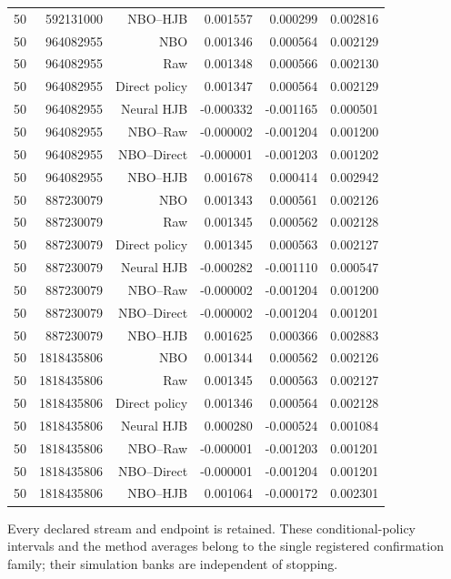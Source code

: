 \begin{longtable}{lrrrrr}
50 & 592131000 & NBO--HJB & 0.001557 & 0.000299 & 0.002816 \\
50 & 964082955 & NBO & 0.001346 & 0.000564 & 0.002129 \\
50 & 964082955 & Raw & 0.001348 & 0.000566 & 0.002130 \\
50 & 964082955 & Direct policy & 0.001347 & 0.000564 & 0.002129 \\
50 & 964082955 & Neural HJB & -0.000332 & -0.001165 & 0.000501 \\
50 & 964082955 & NBO--Raw & -0.000002 & -0.001204 & 0.001200 \\
50 & 964082955 & NBO--Direct & -0.000001 & -0.001203 & 0.001202 \\
50 & 964082955 & NBO--HJB & 0.001678 & 0.000414 & 0.002942 \\
50 & 887230079 & NBO & 0.001343 & 0.000561 & 0.002126 \\
50 & 887230079 & Raw & 0.001345 & 0.000562 & 0.002128 \\
50 & 887230079 & Direct policy & 0.001345 & 0.000563 & 0.002127 \\
50 & 887230079 & Neural HJB & -0.000282 & -0.001110 & 0.000547 \\
50 & 887230079 & NBO--Raw & -0.000002 & -0.001204 & 0.001200 \\
50 & 887230079 & NBO--Direct & -0.000002 & -0.001204 & 0.001201 \\
50 & 887230079 & NBO--HJB & 0.001625 & 0.000366 & 0.002883 \\
50 & 1818435806 & NBO & 0.001344 & 0.000562 & 0.002126 \\
50 & 1818435806 & Raw & 0.001345 & 0.000563 & 0.002127 \\
50 & 1818435806 & Direct policy & 0.001346 & 0.000564 & 0.002128 \\
50 & 1818435806 & Neural HJB & 0.000280 & -0.000524 & 0.001084 \\
50 & 1818435806 & NBO--Raw & -0.000001 & -0.001203 & 0.001201 \\
50 & 1818435806 & NBO--Direct & -0.000001 & -0.001204 & 0.001201 \\
50 & 1818435806 & NBO--HJB & 0.001064 & -0.000172 & 0.002301 \\
\bottomrule
\end{longtable}
\par\medskip\noindent\footnotesize Every declared stream and endpoint is retained. These conditional-policy intervals and the method averages belong to the single registered confirmation family; their simulation banks are independent of stopping.
\endgroup
